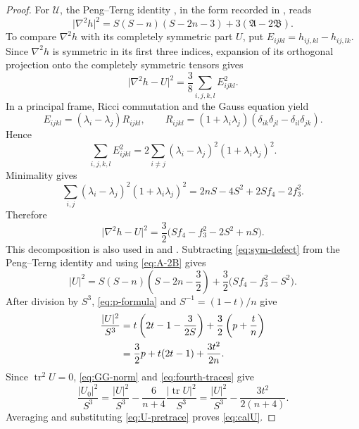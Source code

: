 \documentclass[11pt,reqno]{amsart}
\numberwithin{equation}{section}
\newcommand{\tr}{\operatorname{tr}}
\newcommand{\norm}[1]{\lvert #1\rvert}
\begin{document}
\begin{proof}
For $\mathcal U$, the Peng--Terng identity \cite{PTseminar,PTannalen}, in the form recorded in \cite[Section~2]{CWY}, reads
\[
\norm{\nabla^2h}^2
=S(S-n)(S-2n-3)+3(\mathfrak A-2\mathfrak B).
\]
To compare $\nabla^2h$ with its completely symmetric part $U$, put
$E_{ijkl}=h_{ij,kl}-h_{ij,lk}$. Since $\nabla^2h$ is symmetric in its first three indices, expansion of its orthogonal projection onto the completely symmetric tensors gives
\[
\norm{\nabla^2h-U}^2=\frac38\sum_{i,j,k,l}E_{ijkl}^2.
\]
In a principal frame, Ricci commutation and the Gauss equation yield
\[
E_{ijkl}=(\lambda_i-\lambda_j)R_{ijkl},
\qquad
R_{ijkl}=(1+\lambda_i\lambda_j)
(\delta_{ik}\delta_{jl}-\delta_{il}\delta_{jk}).
\]
Hence
\[
\sum_{i,j,k,l}E_{ijkl}^2
=2\sum_{i\ne j}(\lambda_i-\lambda_j)^2(1+\lambda_i\lambda_j)^2.
\]
Minimality gives
\[
\sum_{i,j}(\lambda_i-\lambda_j)^2(1+\lambda_i\lambda_j)^2
=2nS-4S^2+2Sf_4-2f_3^2.
\]
Therefore
\begin{equation}\label{eq:sym-defect}
\norm{\nabla^2h-U}^2
=\frac32\bigl(Sf_4-f_3^2-2S^2+nS\bigr).
\end{equation}
This decomposition is also used in \cite[Section~3]{CWY} and \cite[Lemma~3.1]{GeTanYanZhang}. Subtracting \eqref{eq:sym-defect} from the Peng--Terng identity and using
\eqref{eq:A-2B} gives
\[
\norm U^2
=S(S-n)\left(S-2n-\frac32\right)
+\frac32\bigl(Sf_4-f_3^2-S^2\bigr).
\]
After division by $S^3$, \eqref{eq:p-formula} and
$S^{-1}=(1-t)/n$ give
\begin{align}
\frac{\norm U^2}{S^3}
&=t\left(2t-1-\frac{3}{2S}\right)
+\frac32\left(p+\frac tn\right)\notag\\
&=\frac32p+t(2t-1)+\frac{3t^2}{2n}.
\label{eq:U-pretrace}
\end{align}
Since $\tr^2U=0$, \eqref{eq:GG-norm} and \eqref{eq:fourth-traces} give
\[
\frac{\norm{U_0}^2}{S^3}
=\frac{\norm U^2}{S^3}-\frac6{n+4}\frac{\norm{\tr U}^2}{S^3}
=\frac{\norm U^2}{S^3}-\frac{3t^2}{2(n+4)}.
\]
Averaging and substituting \eqref{eq:U-pretrace} proves \eqref{eq:calU}.


\end{proof}
\end{document}
